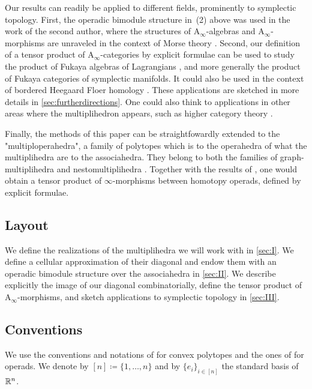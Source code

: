 \documentclass[twoside, 12pt]{amsart}
\theoremstyle{remark}
\begin{document}
\medskip

Our results can readily be applied to different fields, prominently to symplectic topology. 
First, the operadic bimodule structure in~(2) above was used in the work of the second author, where the structures of $\mathrm{A}_\infty$-algebras and $\mathrm{A}_\infty$-morphisms are unraveled in the context of Morse theory \cite{Mazuir21}. 
Second, our definition of a tensor product of $\mathrm{A}_\infty$-categories by explicit formulae can be used to study the product of Fukaya algebras of Lagrangians \cite{amorim-lagrangian}, and more generally the product of Fukaya categories of symplectic manifolds. 
It could also be used in the context of bordered Heegaard Floer homology \cite{LOT20}. 
These applications are sketched in more details in \cref{sec:furtherdirections}.
One could also think to applications in other areas where the multiplihedron appears, such as higher category theory \cite{ForceyQuotient08}.

\medskip

Finally, the methods of this paper can be straightfowardly extended to the "multiploperahedra", a family of polytopes which is to the operahedra of \cite{LA21} what the multiplihedra are to the associahedra. 
They belong to both the families of graph-multiplihedra \cite{DevadossForcey08} and nestomultiplihedra \cite{AD13}.  
Together with the results of \cite{LA21}, one would obtain a tensor product of $\infty$-morphisms between homotopy operads, defined by explicit formulae. 

\subsection*{Layout} 
We define the realizations of the multiplihedra we will work with in \cref{sec:I}. 
We define a cellular approximation of their diagonal and endow them with an operadic bimodule structure over the associahedra in \cref{sec:II}.
We describe explicitly the image of our diagonal combinatorially, define the tensor product of $\mathrm{A}_\infty$-morphisms, and sketch applications to symplectic topology in \cref{sec:III}. 

\subsection*{Conventions} We use the conventions and notations of \cite{Ziegler95} for convex polytopes and the ones of \cite{LodayVallette12} for operads. We denote by $[n]\coloneqq \{1,\ldots,n\}$ and by $\{ e_i\}_{i \in [n]}$ the standard basis of $\mathbb{R}^n$.
\end{document}
